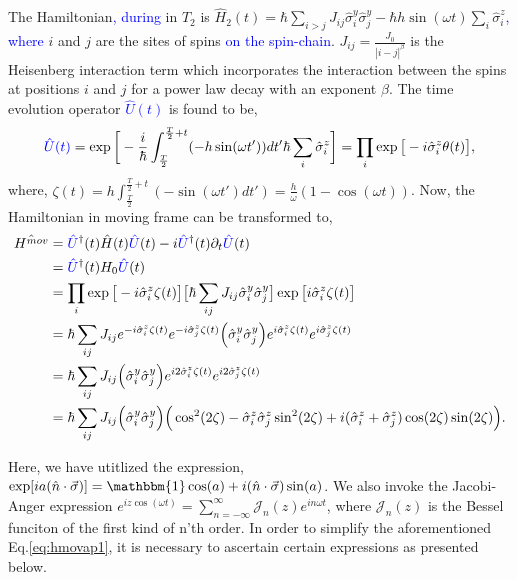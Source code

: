 \documentclass[%
reprint,
superscriptaddress,
amsmath,amssymb,showkeys,
aps,
prb,
]{revtex4-2}
\newcommand{\blue}[1]{\textcolor{blue}{#1}}
\begin{document}
	The Hamiltonian\blue{, during} in $T_2$ is $\displaystyle \hat{H}_2(t) = \hbar\sum_{i>j} J_{ij}\hat{\sigma}^y_i\hat{\sigma}^y_j - \hbar h \sin(\omega t) \sum_i \hat{\sigma}^z_i$\blue{, where} $i$ and $j$ are the sites of spins \blue{on the spin-chain}. $J_{ij} = \frac{J_0}{|i-j|^\beta}$ is the Heisenberg interaction term which incorporates the interaction between the spins at positions  $i$ and $j$ for a power law decay with an exponent $\beta$. 
	The time evolution operator \blue{$\hat{U}(t)$} is found to be\cite{Daniel2020},
	\begin{equation}
		\blue{\hat{U}(t)} = \exp \bigg[-\frac{i}{\hbar}\int_{\frac{T}{2}}^{\frac{T}{2}+t} (-h \sin(\omega t'))dt' \hbar\sum_i\hat{\sigma}^z_i\bigg]
		=\prod_{i} \exp\big[-i \hat{\sigma}^z_i\theta(t)\big],
	\end{equation}
	where, $\displaystyle \zeta (t) = h\int_{\frac{T}{2}}^{\frac{T}{2}+t}  (-\sin(\omega t')dt') =\frac{h}{\omega}(1-\cos(\omega t))$.
	Now, the Hamiltonian in moving frame can be transformed to\cite{haldar_statistical_2022, haldar_dynamical_2021},
	\begin{align}
		\hat{H^{mov}} &= \blue{\hat{U}}^\dagger(t) \hat{H}(t) \blue{\hat{U}}(t)- i \blue{\hat{U}}^\dagger(t) \partial_t \blue{\hat{U}}(t) \nonumber\\
		&= \blue{\hat{U}}^\dagger(t) H_0 \blue{\hat{U}}(t)\nonumber\\
		&= \prod_{i} \exp\big[-i\hat{\sigma}^z_i \zeta(t)\big] \big[\hbar\sum_{ij}J_{ij}\hat{\sigma}^y_i\hat{\sigma}^y_j\big] \exp\big[ i\hat{\sigma}^z_i \zeta(t)\big]\nonumber\\
		&= \hbar\sum_{ij} J_{ij} e^{-i\hat{\sigma}^z_i \zeta(t)} e^{-i\hat{\sigma}^z_j  \zeta(t)}\Big(\hat{\sigma}^y_i\hat{\sigma}^y_j\Big)e^{i\hat{\sigma}^z_i \zeta(t)} e^{i\hat{\sigma}^z_j \zeta(t)}\nonumber\\
		&= \hbar\sum_{ij} J_{ij} \Big(\hat{\sigma}^y_i\hat{\sigma}^y_j\Big)e^{i2\hat{\sigma}^z_i \zeta(t)} e^{i2\hat{\sigma}^z_j \zeta(t)}\nonumber\\
		&= \hbar\sum_{ij} J_{ij} \Big(\hat{\sigma}^y_i\hat{\sigma}^y_j\Big) \Big(\cos^2(2\zeta) -\hat{\sigma}^z_i\hat{\sigma}^z_j \sin^2(2\zeta) + i (\hat{\sigma}^z_i + \hat{\sigma}^z_j)\cos(2\zeta)\sin(2\zeta)\Big).
		\label{eq:hmovap1}
	\end{align}

	Here, we have utitlized the expression, $\exp[ia(\hat{n}\cdot\vec{\sigma})] = \mathbbm{1} \cos(a) + i (\hat{n}\cdot\vec{\sigma})\sin(a)$. We also invoke the Jacobi-Anger expression $\displaystyle e^{iz\cos(\omega t)} = \sum_{n=-\infty}^{\infty}\mathcal{J}_n(z)e^{in\omega t}$\cite{arfkenmath}, where $\mathcal{J}_n(z)$ is the Bessel funciton of the first kind of n'th order. In order to simplify the aforementioned Eq.\eqref{eq:hmovap1}, it is necessary to ascertain certain expressions as presented below.
	
\end{document}
